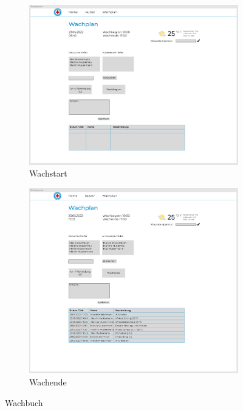 \documentclass[fontsize=12pt,openright,oneside,paper=a4,BCOR=1cm]{scrbook}
\begin{document}
\begin{figure}[H]
  \centering
  \begin{subfigure}[b]{0.7\linewidth}
    \includegraphics[width=\linewidth]{Anlagen/Figma/14-WachplanDurchfuehrung.png}
    \caption{Wachstart}
  \end{subfigure}
  \begin{subfigure}[b]{0.7\linewidth}
    \includegraphics[width=\linewidth]{Anlagen/Figma/19-WachplanDurchfuehrung.png}
    \caption{Wachende}
  \end{subfigure}
  \caption{Wachbuch}
  \label{fig:wachbuch}
\end{figure}
\end{document}
